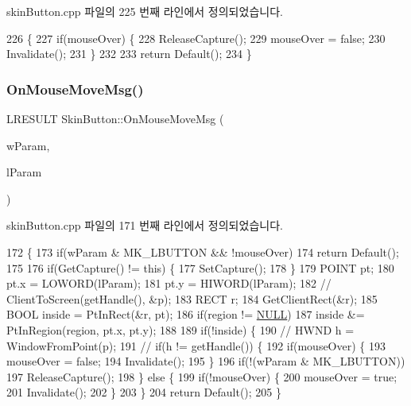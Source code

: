 skin\+Button.\+cpp 파일의 225 번째 라인에서 정의되었습니다.


\begin{DoxyCode}
226 \{
227   \textcolor{keywordflow}{if}(mouseOver) \{
228     ReleaseCapture();
229     mouseOver = \textcolor{keyword}{false};
230     Invalidate();
231   \}
232 
233   \textcolor{keywordflow}{return} Default();
234 \}
\end{DoxyCode}
\mbox{\label{class_skin_button_ad4654dfa88cab2918e1fcd58223cdd5a}} 
\subsubsection{\texorpdfstring{On\+Mouse\+Move\+Msg()}{OnMouseMoveMsg()}}
{\footnotesize\ttfamily L\+R\+E\+S\+U\+LT Skin\+Button\+::\+On\+Mouse\+Move\+Msg (\begin{DoxyParamCaption}\item[{W\+P\+A\+R\+AM}]{w\+Param,  }\item[{L\+P\+A\+R\+AM}]{l\+Param }\end{DoxyParamCaption})}



skin\+Button.\+cpp 파일의 171 번째 라인에서 정의되었습니다.


\begin{DoxyCode}
172 \{
173   \textcolor{keywordflow}{if}(wParam & MK\_LBUTTON && !mouseOver)
174     \textcolor{keywordflow}{return} Default();
175 
176   \textcolor{keywordflow}{if}(GetCapture() != \textcolor{keyword}{this}) \{
177     SetCapture();
178   \}
179   POINT pt;
180   pt.x = LOWORD(lParam);
181   pt.y = HIWORD(lParam);
182   \textcolor{comment}{//  ClientToScreen(getHandle(), &p);}
183   RECT r;
184   GetClientRect(&r);
185   BOOL inside = PtInRect(&r, pt);
186   \textcolor{keywordflow}{if}(region != \mbox{\hyperlink{getopt1_8c_a070d2ce7b6bb7e5c05602aa8c308d0c4}{NULL}})
187     inside &= PtInRegion(region, pt.x, pt.y);
188 
189   \textcolor{keywordflow}{if}(!inside) \{
190     \textcolor{comment}{//  HWND h = WindowFromPoint(p);}
191     \textcolor{comment}{//  if(h != getHandle()) \{}
192     \textcolor{keywordflow}{if}(mouseOver) \{
193       mouseOver = \textcolor{keyword}{false};
194       Invalidate();
195     \}
196     \textcolor{keywordflow}{if}(!(wParam & MK\_LBUTTON))
197       ReleaseCapture();
198   \} \textcolor{keywordflow}{else} \{
199     \textcolor{keywordflow}{if}(!mouseOver) \{
200       mouseOver = \textcolor{keyword}{true};
201       Invalidate();
202     \}
203   \}
204   \textcolor{keywordflow}{return} Default();
205 \}
\end{DoxyCode}
\mbox{\label{class_skin_button_ac508eb8cb788a169c264f48e202aec37}} 
